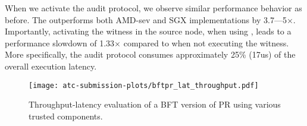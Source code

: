 When we activate the audit protocol, we observe similar performance behavior as before. The \projecttitle{} outperforms both AMD-sev and SGX implementations by 3.7---5$\times$. Importantly, activating the witness in the source node, when using \projecttitle{}, leads to a performance slowdown of 1.33$\times$ compared to when not executing the witness. More specifically, the audit protocol consumes approximately 25\% (17us) of the overall execution latency. 

\begin{figure}[t!]
    \centering
    \texttt{[image: atc-submission-plots/bftpr\_lat\_throughput.pdf]} 
    \caption{Throughput-latency evaluation of a BFT version of PR using various trusted components.} \label{fig:lat_throughput_kernel}
\end{figure}
\fi